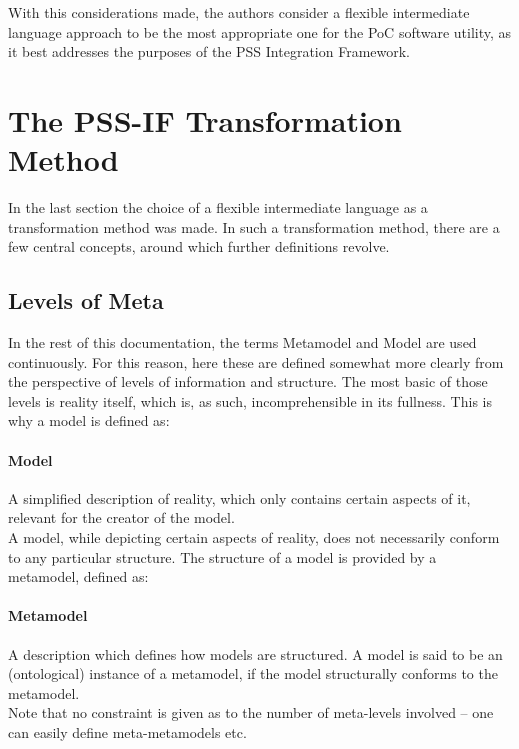 With this considerations made, the authors consider a flexible intermediate language approach to be the most appropriate one for the PoC software utility, as it best addresses the purposes of the PSS Integration Framework.

\section{The PSS-IF Transformation Method}
\label{sec:approach:pssif}

In the last section the choice of a flexible intermediate language as a transformation method was made. In such a transformation method, there are a few central concepts, around which further definitions revolve.

\subsection{Levels of Meta}

In the rest of this documentation, the terms Metamodel and Model are used continuously. For this reason, here these are defined somewhat more clearly from the perspective of levels of information and structure. The most basic of those levels is reality itself, which is, as such, incomprehensible in its fullness. This is why a model is defined as:

\paragraph{Model} A simplified description of reality, which only contains certain aspects of it, relevant for the creator of the model.\\

A model, while depicting certain aspects of reality, does not necessarily conform to any particular structure. The structure of a model is provided by a metamodel, defined as:

\paragraph{Metamodel} A description which defines how models are structured. A model is said to be an (ontological) instance of a metamodel, if the model structurally conforms to the metamodel.\\

Note that no constraint is given as to the number of meta-levels involved -- one can easily define meta-metamodels etc.

